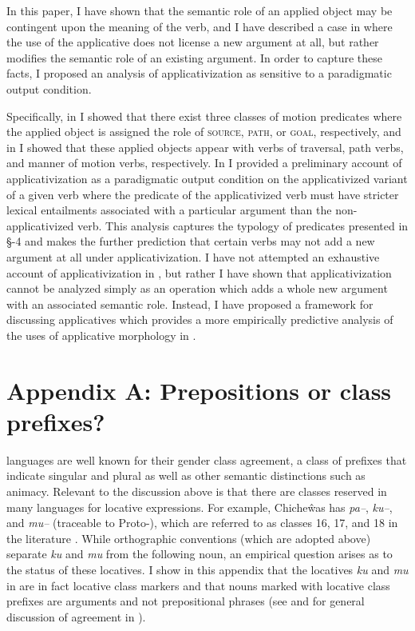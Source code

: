 \documentclass[output=paper]{langsci/langscibook}
\begin{document}
In this paper, I have shown that the semantic role of an applied object may be contingent upon the meaning of the verb, and I have described a case in  where the use of the applicative does not license a new argument at all, but rather modifies the semantic role of an existing argument. In order to capture these facts, I proposed an analysis of applicativization as sensitive to a paradigmatic output condition. 
 
Specifically, in  I showed that there exist three classes of motion predicates where the applied object is assigned the role of {\scshape source, path,} or {\scshape goal,} respectively, and in  I showed that  these applied objects appear with verbs of traversal, path verbs, and manner of motion verbs, respectively. In  I provided a preliminary account of applicativization as a paradigmatic output condition on the applicativized variant of a given verb where the predicate of the applicativized verb must have stricter lexical entailments associated with a particular argument than the non-applicativized verb. This analysis captures the typology of predicates presented in \S{}-4 and makes the further prediction that certain verbs may not add a new argument at all under applicativization. I have not attempted an exhaustive account of applicativization in , but rather I have shown that applicativization cannot be analyzed simply as an operation which adds a whole new argument with an associated semantic role. Instead, I have proposed a framework for discussing applicatives which provides a more empirically predictive analysis of the uses of applicative morphology in . 
 
 
 \section*{Appendix A: Prepositions or class prefixes?}
 
  languages are well known for their gender class agreement, a class of prefixes that indicate singular and plural as well as other semantic distinctions such as animacy. Relevant to the discussion above is that there are classes reserved in many  languages for locative expressions. For example, Chicheŵas has \emph{pa--}, \emph{ku--}, and \emph{mu--} (traceable to Proto-), which are referred to as classes 16, 17, and 18 in the literature \citep{BresnanKanerva1989,bresnan:1994,bresnanmchombo:1995,maho:1999}. While  orthographic conventions (which are adopted above) separate \emph{ku} and \emph{mu} from the following noun, an empirical question arises as to the status of these locatives. I show in this appendix that the locatives \emph{ku} and \emph{mu} in  are in fact locative class markers and that nouns marked with locative class prefixes are arguments and not prepositional phrases (see \citealt{Jerro2013} and \citealt{JerroWechsler2015} for general discussion of agreement in ).
 
\end{document}
